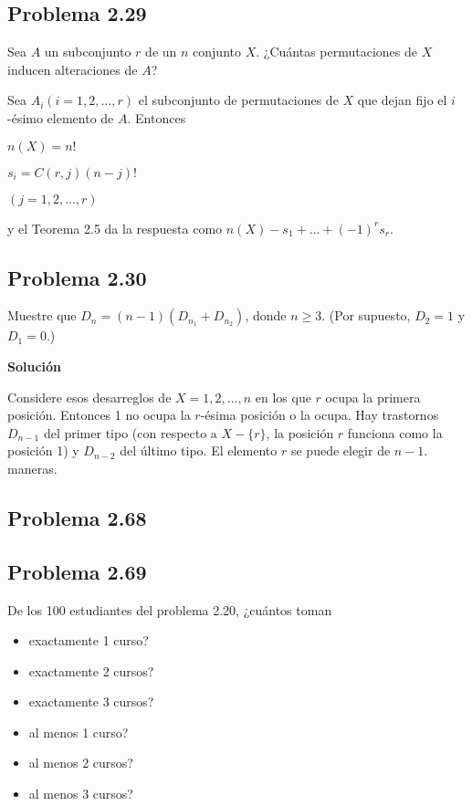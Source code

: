 \documentclass[12pt]{article}
\begin{document}
\subsection*{Problema 2.29}
Sea $A$ un subconjunto $r$ de un $n$ conjunto $X$. ¿Cuántas permutaciones de $X$ inducen
alteraciones de $A$?

Sea $A_i (i = 1, 2,..., r)$ el subconjunto de permutaciones de $X$ que dejan fijo el
$i$-ésimo elemento de $A$. Entonces 

$n(X)=n!$

$s_i = C(r,j)(n-j)!$

$(j=1,2,...,r)$

y el Teorema 2.5 da la respuesta como $n(X) -s_1 + ... + (-1)^r s_r .$


\subsection*{Problema 2.30}

Muestre que $D_n = (n - 1)(D_{n_ 1} + D_{n_2})$, donde $n \geq 3$. (Por supuesto,
$D_2 = 1$ y $D_1 = 0$.)

\textbf{Solución}

Considere esos desarreglos de $X = {1, 2,..., n}$ en los que $r$ ocupa la primera
posición. Entonces 1 no ocupa la $r$-ésima posición o la ocupa. Hay trastornos
$D_{n-1}$ del primer tipo (con respecto a $X - \{r\}$, la posición $r$ funciona como la
posición 1) y $D_{n-2}$ del último tipo. El elemento $r$ se puede elegir de $n-1$.
maneras.

\subsection*{Problema 2.68}

\subsection*{Problema 2.69}
De los 100 estudiantes del problema 2.20, ¿cuántos toman 

\begin{itemize}
    \item exactamente 1 curso? 
    \item exactamente 2 cursos? 
    \item exactamente 3 cursos? 
    \item al menos 1 curso?
    \item al menos 2 cursos? 
    \item al menos 3 cursos?
\end{itemize}
\end{document}
